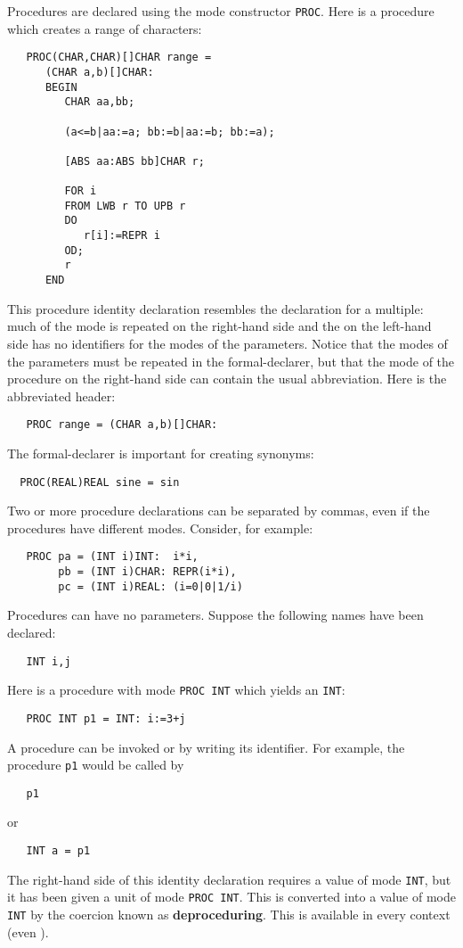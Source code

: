 Procedures are declared using the mode constructor \verb|PROC|. Here is
a procedure which creates a range of characters:
\begin{verbatim}
   PROC(CHAR,CHAR)[]CHAR range =
      (CHAR a,b)[]CHAR:
      BEGIN
         CHAR aa,bb;

         (a<=b|aa:=a; bb:=b|aa:=b; bb:=a);

         [ABS aa:ABS bb]CHAR r;

         FOR i
         FROM LWB r TO UPB r
         DO
            r[i]:=REPR i
         OD;
         r
      END
\end{verbatim}
\noindent
This procedure identity declaration resembles the declaration for a
multiple: much of the mode is repeated on the right-hand side and the
 on the left-hand side has no identifiers for the
modes of the parameters.  Notice that the modes of the parameters
must be repeated in the formal-declarer, but that the mode of the
procedure on the right-hand side can contain the usual abbreviation.
Here is the abbreviated header:
\begin{verbatim}
   PROC range = (CHAR a,b)[]CHAR:
\end{verbatim}

The formal-declarer is important for creating synonyms:
\begin{verbatim}
  PROC(REAL)REAL sine = sin
\end{verbatim}

Two or more procedure declarations can be separated by commas, even if
the procedures have different modes. Consider, for example:
\begin{verbatim}
   PROC pa = (INT i)INT:  i*i,
        pb = (INT i)CHAR: REPR(i*i),
        pc = (INT i)REAL: (i=0|0|1/i)
\end{verbatim}

Procedures can have no parameters. Suppose the following names have
been declared:
\begin{verbatim}
   INT i,j
\end{verbatim}
\noindent
Here is a procedure with mode \verb|PROC INT| which yields an
\verb|INT|:
\begin{verbatim}
   PROC INT p1 = INT: i:=3+j
\end{verbatim}
\noindent
A procedure can be invoked or  by writing
its identifier.  For example, the procedure \verb|p1| would be called
by
\begin{verbatim}
   p1
\end{verbatim}
\noindent
or
\begin{verbatim}
   INT a = p1
\end{verbatim}
\noindent
The right-hand side of this identity declaration requires a value of
mode \verb|INT|, but it has been given a unit of mode
\verb|PROC INT|.  This is converted into a value of mode \verb|INT|
by the coercion known as \textbf{deproceduring}. This
 is available in every context
(even ).

